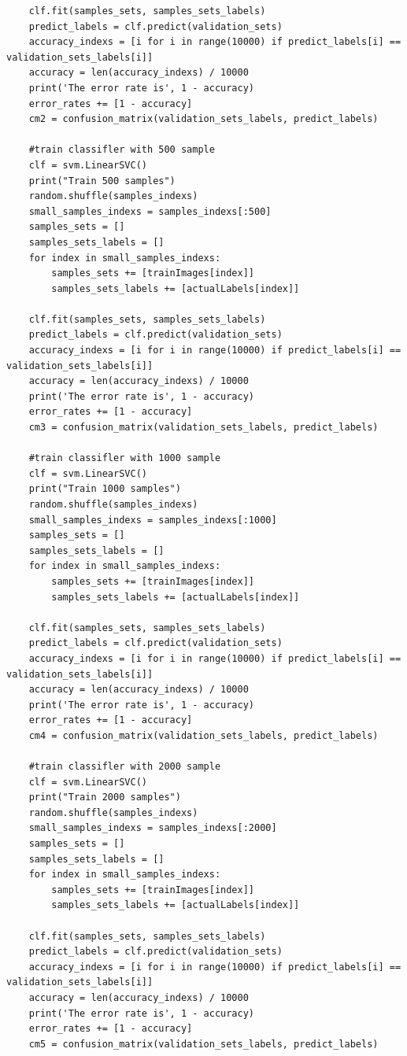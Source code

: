\documentclass[11pt]{article}
\begin{document}
\begin{lstlisting}
	clf.fit(samples_sets, samples_sets_labels)
	predict_labels = clf.predict(validation_sets)
	accuracy_indexs = [i for i in range(10000) if predict_labels[i] == validation_sets_labels[i]]
	accuracy = len(accuracy_indexs) / 10000
	print('The error rate is', 1 - accuracy)
	error_rates += [1 - accuracy]
	cm2 = confusion_matrix(validation_sets_labels, predict_labels)

	#train classifler with 500 sample
	clf = svm.LinearSVC()
	print("Train 500 samples")
	random.shuffle(samples_indexs)
	small_samples_indexs = samples_indexs[:500]
	samples_sets = []
	samples_sets_labels = []
	for index in small_samples_indexs:
		samples_sets += [trainImages[index]]
		samples_sets_labels += [actualLabels[index]]

	clf.fit(samples_sets, samples_sets_labels)
	predict_labels = clf.predict(validation_sets)
	accuracy_indexs = [i for i in range(10000) if predict_labels[i] == validation_sets_labels[i]]
	accuracy = len(accuracy_indexs) / 10000
	print('The error rate is', 1 - accuracy)
	error_rates += [1 - accuracy]
	cm3 = confusion_matrix(validation_sets_labels, predict_labels)

	#train classifler with 1000 sample
	clf = svm.LinearSVC()
	print("Train 1000 samples")
	random.shuffle(samples_indexs)
	small_samples_indexs = samples_indexs[:1000]
	samples_sets = []
	samples_sets_labels = []
	for index in small_samples_indexs:
		samples_sets += [trainImages[index]]
		samples_sets_labels += [actualLabels[index]]

	clf.fit(samples_sets, samples_sets_labels)
	predict_labels = clf.predict(validation_sets)
	accuracy_indexs = [i for i in range(10000) if predict_labels[i] == validation_sets_labels[i]]
	accuracy = len(accuracy_indexs) / 10000
	print('The error rate is', 1 - accuracy)
	error_rates += [1 - accuracy]
	cm4 = confusion_matrix(validation_sets_labels, predict_labels)

	#train classifler with 2000 sample
	clf = svm.LinearSVC()
	print("Train 2000 samples")
	random.shuffle(samples_indexs)
	small_samples_indexs = samples_indexs[:2000]
	samples_sets = []
	samples_sets_labels = []
	for index in small_samples_indexs:
		samples_sets += [trainImages[index]]
		samples_sets_labels += [actualLabels[index]]

	clf.fit(samples_sets, samples_sets_labels)
	predict_labels = clf.predict(validation_sets)
	accuracy_indexs = [i for i in range(10000) if predict_labels[i] == validation_sets_labels[i]]
	accuracy = len(accuracy_indexs) / 10000
	print('The error rate is', 1 - accuracy)
	error_rates += [1 - accuracy]
	cm5 = confusion_matrix(validation_sets_labels, predict_labels)


\end{lstlisting}
\end{document}
